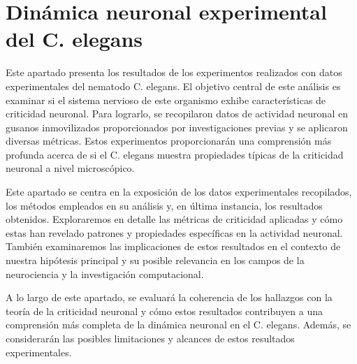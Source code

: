 \chapter{Dinámica neuronal experimental del C. elegans}\label{cap:resultado_critico}
\graphicspath{{figs/capitulo_resultado_critico/}}


Este apartado presenta los resultados de los experimentos realizados con datos experimentales del nematodo C. elegans. El objetivo central de este análisis es examinar si el sistema nervioso de este organismo exhibe características de criticidad neuronal. Para lograrlo, se recopilaron datos de actividad neuronal en gusanos inmovilizados proporcionados por investigaciones previas y se aplicaron diversas métricas. Estos experimentos proporcionarán una comprensión más profunda acerca de si el C. elegans muestra propiedades típicas de la criticidad neuronal a nivel microscópico.

Este apartado se centra en la exposición de los datos experimentales recopilados, los métodos empleados en su análisis y, en última instancia, los resultados obtenidos. Exploraremos en detalle las métricas de criticidad aplicadas y cómo estas han revelado patrones y propiedades específicas en la actividad neuronal. También examinaremos las implicaciones de estos resultados en el contexto de nuestra hipótesis principal y su posible relevancia en los campos de la neurociencia y la investigación computacional.

A lo largo de este apartado, se evaluará la coherencia de los hallazgos con la teoría de la criticidad neuronal y cómo estos resultados contribuyen a una comprensión más completa de la dinámica neuronal en el C. elegans. Además, se considerarán las posibles limitaciones y alcances de estos resultados experimentales.


